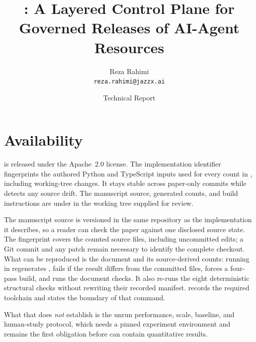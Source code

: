 \documentclass{scrreprt}
\title{\sysbare: A Layered Control Plane for\\Governed Releases of AI-Agent Resources}
\author{%
  Reza Rahimi\\[0.4ex]
  \normalsize\texttt{reza.rahimi@jazzx.ai}%
}
\date{Technical Report\\[0.5ex]\sysacronymtext}
\renewcommand{\thesection}{\arabic{section}}
\providecommand{\statSourceHash}{unknown}}
\begin{document}
\maketitle



\clearpage
\renewcommand{\contentsname}{Table of Contents}
\tableofcontents

\clearpage
\clearpage
\clearpage
\clearpage
\clearpage
\clearpage
\clearpage
\clearpage
\clearpage
\clearpage
\clearpage
\clearpage
\clearpage
\clearpage

\clearpage
\section*{Availability}
\label{sec:availability}
\sys is released under the Apache~2.0 license. The implementation identifier
\code{\statSourceHash} fingerprints the authored Python and TypeScript inputs
used for every count in , including working-tree changes.
It stays stable across paper-only commits while  detects any
source drift. The manuscript source, generated counts, and build
instructions are under  in the working tree supplied for review.

The manuscript source is versioned in the same repository as the implementation it
describes, so a reader can check the paper against one disclosed source state. The
fingerprint covers the counted source files, including uncommitted edits; a Git
commit and any patch remain necessary to identify the complete checkout.
What can be reproduced is the document and its source-derived counts: running
 in  regenerates , fails if
the result differs from the committed files, forces a four-pass build, and runs the
document checks. It also re-runs the eight deterministic structural checks without
rewriting their recorded manifest.  records the required
toolchain and states the boundary of that command.

What that does \emph{not} establish is the unrun performance, scale, baseline, and
human-study protocol, which needs a pinned experiment environment and remains the
first obligation before  can contain quantitative results.

\clearpage
{}
{\small

}

\appendix
\renewcommand{\thesection}{\Alph{section}}
\clearpage
\clearpage
\clearpage
\clearpage
\end{document}
